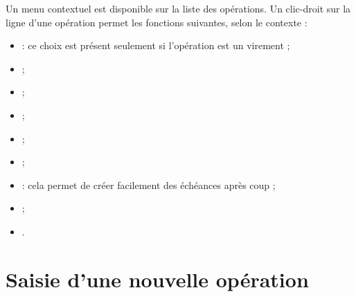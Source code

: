 Un menu contextuel est disponible sur la liste des opérations. Un clic-droit sur la ligne d'une opération permet les fonctions suivantes, selon le contexte :

\begin{itemize}
	\ifIllustration
	\label{transactions-contextMenu-img}
	\fi
	 \item {} : ce choix est présent seulement si l'opération est un virement ;
	 \item {} ;
	 \item {} ;
	 \item {} ;
	 \item {} ;
	 \item {} ;
	 \item {} : cela permet de créer
	facilement des échéances après coup ;
	 \item {} ;
	 \item {}.
\end{itemize}


\section{Saisie d'une nouvelle opération\label{transactions-new}}


